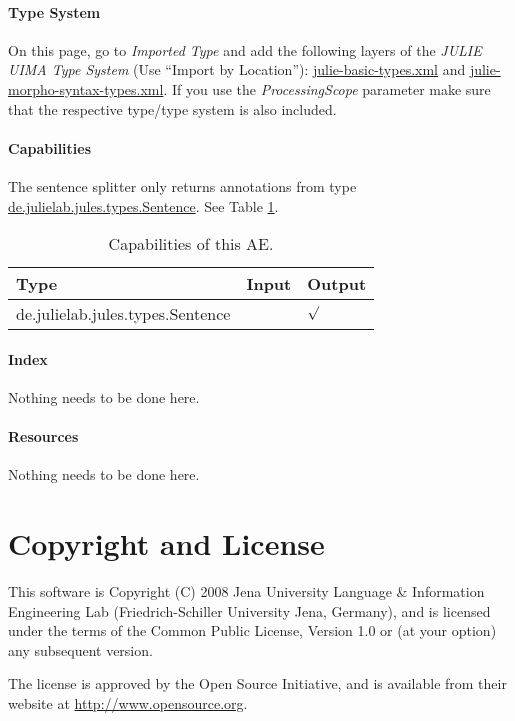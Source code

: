 \documentclass[11pt,a4paper,halfparskip]{scrartcl}
\begin{document}
\paragraph{Type System}
\label{sss:type_system}
On this page, go to \emph{Imported Type} and add the following layers
of the \emph{JULIE UIMA Type System} (Use ``Import by Location''):
\url{julie-basic-types.xml} and
\url{julie-morpho-syntax-types.xml}. If you use the
\textit{ProcessingScope} parameter make sure that the respective
type/type system is also included.


\paragraph{Capabilities}
\label{sss:capabilities}
The sentence splitter only returns annotations from type \url{de.julielab.jules.types.Sentence}. See Table \ref{tab:capabilities}.
\begin{table}[h!]
  \centering
  \begin{tabular}{|p{5cm}|p{2cm}|p{2cm}|}
    \hline
    Type & Input & Output \\
    \hline\hline
     de.julielab.jules.types.Sentence & &  $\surd$  \\
      \hline
  \end{tabular}
  \caption{Capabilities of this AE.}
  \label{tab:capabilities}
\end{table} 

\paragraph{Index}
Nothing needs to be done here.

\paragraph{Resources}
Nothing needs to be done here.


\section{Copyright and License}
This software is Copyright (C) 2008 Jena University Language \& Information
Engineering Lab (Friedrich-Schiller University Jena, Germany), and is
licensed under the terms of the Common Public License, Version 1.0 or (at
your option) any subsequent version.

The license is approved by the Open Source Initiative, and is
available from their website at \url{http://www.opensource.org}.



\end{document}
